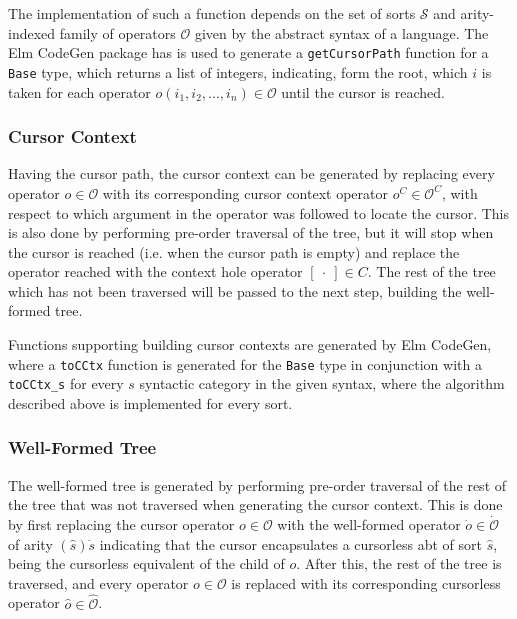\documentclass[sigplan]{acmart}
\newcommand{\abt}{\textsf{abt}\xspace}
\begin{document}
The implementation of such a function depends on the set of sorts $\mathcal{S}$
and arity-indexed family of operators $\mathcal{O}$ given by the abstract syntax
of a language. The Elm CodeGen package\cite{elm-codegen-package} has is used to
generate a \texttt{getCursorPath} function for a \texttt{Base} type, which returns a list of integers, indicating, form the root, which $i$ is taken for each operator $o(i_1,i_2,...,i_n) \in \mathcal{O}$ until the cursor is reached.

\subsubsection{Cursor Context}

Having the cursor path, the cursor context can be generated by replacing every
operator $o \in \mathcal{O}$ with its corresponding cursor context operator
$o^C \in \mathcal{O}^C$, with respect to which argument in the operator was
followed to locate the cursor. This is also done by performing pre-order traversal
of the tree, but it will stop when the cursor is reached (i.e. when the
cursor path is empty) and replace the operator reached with the
context hole operator $[ \ \cdot \ ] \in C$. The rest of the tree which has not
been traversed will be passed to the next step, building the well-formed tree.

Functions supporting building cursor contexts are generated by Elm
CodeGen, where a \texttt{toCCtx} function is generated for the
\texttt{Base} type in conjunction with a \texttt{toCCtx\_s} for every
$s$ syntactic category in the given syntax, where the algorithm
described above is implemented for every sort.

\subsubsection{Well-Formed Tree}

The well-formed tree is generated by performing pre-order traversal of the
rest of the tree that was not traversed when generating the cursor context.
This is done by first replacing the cursor operator $o \in \mathcal{O}$ with the well-formed operator
$\dot{o} \in \dot{\mathcal{O}}$ of arity $(\hat{s})\dot{s}$ indicating that the
cursor encapsulates a cursorless \abt of sort $\hat{s}$, being the cursorless equivalent of the child of $o$.
After this, the rest of the tree is traversed, and every operator $o \in \mathcal{O}$
is replaced with its corresponding cursorless operator $\hat{o} \in \hat{\mathcal{O}}$.
\end{document}
